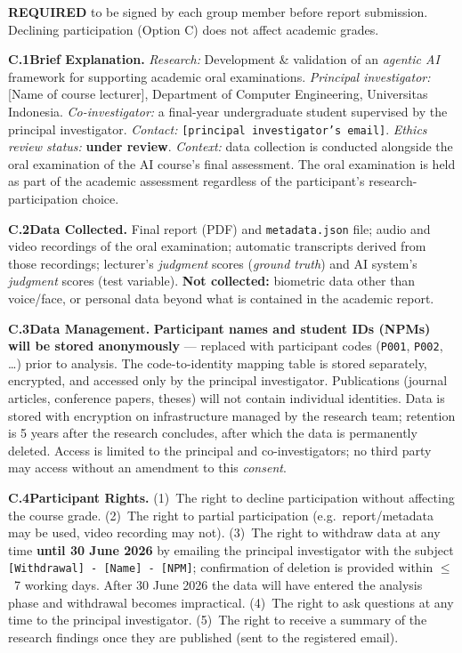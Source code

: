 \documentclass[11pt,a4paper,oneside]{report}
\begin{document}
\begin{petunjuk}
\small
\textbf{REQUIRED} to be signed by each group member before report submission. Declining participation (Option C) does not affect academic grades.
\end{petunjuk}

{\small
\textbf{C.1\quad Brief Explanation.}
\textit{Research:} Development \& validation of an \textit{agentic AI} framework for supporting academic oral examinations.
\textit{Principal investigator:} [Name of course lecturer], Department of Computer Engineering, Universitas Indonesia. \textit{Co-investigator:} a final-year undergraduate student supervised by the principal investigator.
\textit{Contact:} \texttt{[principal investigator's email]}. \textit{Ethics review status:} \textbf{under review}.
\textit{Context:} data collection is conducted alongside the oral examination of the AI course's final assessment. The oral examination is held as part of the academic assessment regardless of the participant's research-participation choice.

\textbf{C.2\quad Data Collected.}
Final report (PDF) and \texttt{metadata.json} file; audio and video recordings of the oral examination; automatic transcripts derived from those recordings; lecturer's \textit{judgment} scores (\textit{ground truth}) and AI system's \textit{judgment} scores (test variable). \textbf{Not collected:} biometric data other than voice/face, or personal data beyond what is contained in the academic report.

\textbf{C.3\quad Data Management.}
\textbf{Participant names and student IDs (NPMs) will be stored anonymously} --- replaced with participant codes (\texttt{P001}, \texttt{P002}, \ldots) prior to analysis. The code-to-identity mapping table is stored separately, encrypted, and accessed only by the principal investigator. Publications (journal articles, conference papers, theses) will not contain individual identities. Data is stored with encryption on infrastructure managed by the research team; retention is 5 years after the research concludes, after which the data is permanently deleted. Access is limited to the principal and co-investigators; no third party may access without an amendment to this \textit{consent}.

\textbf{C.4\quad Participant Rights.}
(1)~The right to decline participation without affecting the course grade. (2)~The right to partial participation (e.g.\ report/metadata may be used, video recording may not). (3)~The right to withdraw data at any time \textbf{until 30 June 2026} by emailing the principal investigator with the subject \texttt{[Withdrawal] - [Name] - [NPM]}; confirmation of deletion is provided within $\le$~7 working days. After 30 June 2026 the data will have entered the analysis phase and withdrawal becomes impractical. (4)~The right to ask questions at any time to the principal investigator. (5)~The right to receive a summary of the research findings once they are published (sent to the registered email).

}
\end{document}
